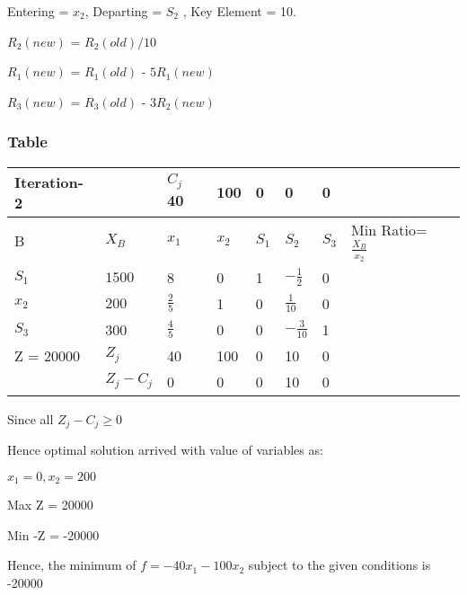 \documentclass{beamer}
\begin{document}
\begin{frame}

Entering = $x_{2}$, Departing = $S_{2}$ , Key Element = 10.\newline

$R_{2}(new)$ = $R_{2}(old)/10$\newline

$R_{1}(new)$ = $R_{1}(old)$ - $5R_{1}(new)$\newline

$R_{3}(new)$ = $R_{3}(old)$ - $3R_{2}(new)$\newline


    
\end{frame}




\begin{frame}
\frametitle{Table}
\begin{table}
\begin{tabular}{l l l l l l l l l }
\toprule
\textbf{Iteration-2} & \textbf{} & \textbf{$C_{j}$} \textbf{40} & \textbf{100} & \textbf{0} & \textbf{0} & \textbf{0} & \textbf{       }\\

\midrule
B & $X_{B}$ & $x_{1}$ & $x_{2}$ & $S_{1}$ & $S_{2}$ & $S_{3}$ & Min Ratio=$\frac{X_{B}}{x_{2}}$\\
$S_{1}$ & $1500$ & 8 & 0 & 1 & $-\frac{1}{2}$ & 0 & \\

$x_{2}$ & $200$ & $\frac{2}{5}$ & 1 & 0 & $\frac{1}{10}$ & 0 & \\

$S_{3}$ & 300 & $\frac{4}{5}$ & 0 & 0 & $-\frac{3}{10}$ & 1 & \\

Z = 20000 & $Z_{j}$  & 40 & 100 & 0 & 10 & 0 &  \\
\bottomrule

   & $Z_{j}-C_{j}$ & 0 & 0 & 0 & 10 & 0 &  \\
\end{tabular}

\end{table}\newline


\end{frame}

\begin{frame}

Since all $Z_{j}-C_{j} \geq 0$\newline

Hence optimal solution arrived with value of variables as:\newline

$x_{1} = 0,x_{2} = 200$\newline

Max Z = 20000\newline

Min -Z = -20000\newline

Hence, the minimum of  $ f = -40x_{1}-100x_{2}$ subject to the given conditions is -20000
    
\end{frame}
\end{document}
